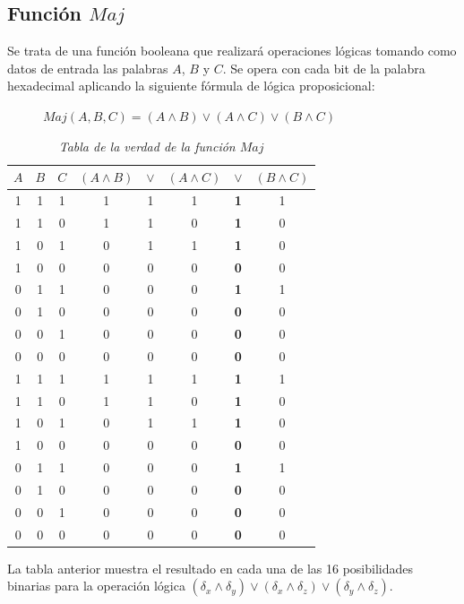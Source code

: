 \documentclass{article}
\begin{document}
    \subsection{Función $Maj$}
        Se trata de una función booleana que realizará operaciones lógicas tomando como datos de entrada las palabras $A$, $B$ y $C$. Se opera con cada bit de la palabra hexadecimal aplicando la siguiente fórmula de lógica proposicional:
            \begin{figure}[H]
            \centering
                $Maj(A, B, C) = (A \land B) \lor (A \land C) \lor ( B \land C)$
            \end{figure}
            \begin{table}[H]
            \centering
            \begin{tabular}{| c c c | c c c c c |} 
                \hline
                $A$ & $B$ & $C$ & $(A \land B)$ & $\lor$ & $(A \land C)$ & $\lor$ & $( B \land C)$ \\
                \hline
                1 & 1 & 1 & 1 & 1 & 1 & \textbf1 & 1 \\
                1 & 1 & 0 & 1 & 1 & 0 & \textbf1 & 0 \\
                1 & 0 & 1 & 0 & 1 & 1 & \textbf1 & 0 \\
                1 & 0 & 0 & 0 & 0 & 0 & \textbf0 & 0 \\
                0 & 1 & 1 & 0 & 0 & 0 & \textbf1 & 1 \\
                0 & 1 & 0 & 0 & 0 & 0 & \textbf0 & 0 \\
                0 & 0 & 1 & 0 & 0 & 0 & \textbf0 & 0 \\
                0 & 0 & 0 & 0 & 0 & 0 & \textbf0 & 0 \\
                1 & 1 & 1 & 1 & 1 & 1 & \textbf1 & 1 \\
                1 & 1 & 0 & 1 & 1 & 0 & \textbf1 & 0 \\
                1 & 0 & 1 & 0 & 1 & 1 & \textbf1 & 0 \\
                1 & 0 & 0 & 0 & 0 & 0 & \textbf0 & 0 \\
                0 & 1 & 1 & 0 & 0 & 0 & \textbf1 & 1 \\
                0 & 1 & 0 & 0 & 0 & 0 & \textbf0 & 0 \\
                0 & 0 & 1 & 0 & 0 & 0 & \textbf0 & 0 \\
                0 & 0 & 0 & 0 & 0 & 0 & \textbf0 & 0 \\
                \hline
            \end{tabular}
            \caption{\textit{Tabla de la verdad de la función $Maj$}}
            \label{table:2}
            \end{table}
        La tabla anterior muestra el resultado en cada una de las 16 posibilidades binarias para la operación lógica $(\delta_{x} \land \delta_{y}) \lor (\delta_{x} \land \delta_{z}) \lor (\delta_{y} \land \delta_{z})$.
        
\end{document}
